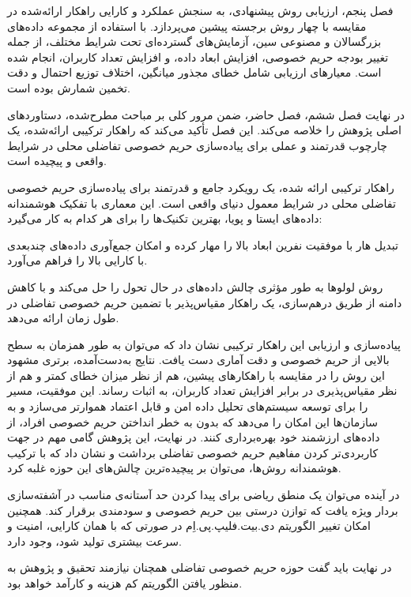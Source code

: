 فصل پنجم، ارزیابی روش پیشنهادی، به سنجش عملکرد و کارایی راهکار ارائه‌شده در مقایسه با چهار روش برجسته پیشین می‌پردازد. با استفاده از مجموعه داده‌های بزرگسالان و مصنوعی سین، آزمایش‌های گسترده‌ای تحت شرایط مختلف، از جمله تغییر بودجه حریم خصوصی، افزایش ابعاد داده، و افزایش تعداد کاربران، انجام شده است. معیارهای ارزیابی شامل خطای مجذور میانگین، اختلاف توزیع احتمال و دقت تخمین شمارش بوده است.

در نهایت فصل ششم، فصل حاضر، ضمن مرور کلی بر مباحث مطرح‌شده، دستاوردهای اصلی پژوهش را خلاصه می‌کند. این فصل تأکید می‌کند که راهکار ترکیبی ارائه‌شده، یک چارچوب قدرتمند و عملی برای پیاده‌سازی حریم خصوصی تفاضلی محلی در شرایط واقعی و پیچیده است.


راهکار ترکیبی ارائه شده، یک رویکرد جامع و قدرتمند برای پیاده‌سازی حریم خصوصی تفاضلی محلی در شرایط معمول دنیای واقعی است. این معماری با تفکیک هوشمندانه داده‌های ایستا و پویا، بهترین تکنیک‌ها را برای هر کدام به کار می‌گیرد:


 تبدیل هار با موفقیت نفرین ابعاد بالا را مهار کرده و امکان جمع‌آوری داده‌های چندبعدی با کارایی بالا را فراهم می‌آورد.

 روش لولوها به طور مؤثری چالش داده‌های در حال تحول را حل می‌کند و با کاهش دامنه از طریق درهم‌سازی، یک راهکار مقیاس‌پذیر با تضمین حریم خصوصی تفاضلی در طول زمان ارائه می‌دهد.


پیاده‌سازی و ارزیابی این راهکار ترکیبی نشان داد که می‌توان به طور همزمان به سطح بالایی از حریم خصوصی و دقت آماری دست یافت. نتایج به‌دست‌آمده، برتری مشهود این روش را در مقایسه با راهکارهای پیشین، هم از نظر میزان خطای کمتر و هم از نظر مقیاس‌پذیری در برابر افزایش تعداد کاربران، به اثبات رساند. این موفقیت، مسیر را برای توسعه سیستم‌های تحلیل داده امن و قابل اعتماد هموارتر می‌سازد و به سازمان‌ها این امکان را می‌دهد که بدون به خطر انداختن حریم خصوصی افراد، از داده‌های ارزشمند خود بهره‌برداری کنند. در نهایت، این پژوهش گامی مهم در جهت کاربردی‌تر کردن مفاهیم حریم خصوصی تفاضلی برداشت و نشان داد که با ترکیب هوشمندانه روش‌ها، می‌توان بر پیچیده‌ترین چالش‌های این حوزه غلبه کرد.


در آینده می‌توان یک منطق ریاضی برای پیدا کردن حد آستانه‌ی مناسب در آشفته‌سازی بردار ویژه یافت که توازن درستی بین حریم خصوصی و سودمندی برقرار کند. همچنین امکان تغییر الگوریتم دی.بیت.فلیپ.پی.اِم در صورتی که با همان کارایی، امنیت و سرعت بیشتری تولید شود، وجود دارد.

در نهایت باید گفت حوزه حریم خصوصی تفاضلی همچنان نیازمند تحقیق و پژوهش به منظور یافتن الگوریتم کم هزینه و کارآمد خواهد بود.



